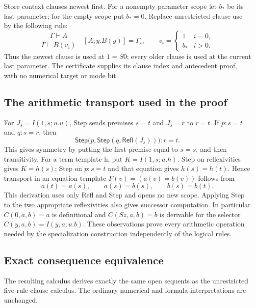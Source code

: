 Store context
clauses newest first.  For a nonempty parameter scope let \(b_*\) be its
last parameter; for the empty scope put \(b_*=0\).  Replace unrestricted
clause use by the following rule:
\[
 \frac{\Gamma\vdash A}{\Gamma\vdash B(v_i)}
 \quad [A;y.B(y)]=\Gamma_i,
 \qquad v_i=\begin{cases}1&i=0,\\ b_*&i>0.\end{cases}
 \tag{Use$_*$}
\]
Thus the newest clause is used at \(1=S0\); every older clause is used
at the current last parameter.  The certificate supplies its clause
index and antecedent proof, with no numerical target or mode bit.

\subsection{The arithmetic transport used in the proof}

For \(J_s=I(1,s;u.u)\), Step sends premises \(s=t\) and \(J_s=r\)
to \(r=t\).  If \(p:s=t\) and \(q:s=r\), then
\[
 \mathsf{Step}\bigl(p,\mathsf{Step}(q,\mathsf{Refl}(J_s))\bigr)
       :r=t.
 \tag{Pivot}
\]
This gives symmetry by putting the first premise equal to \(s=s\), and
then transitivity.  For a term template h, put \(K=I(1,s;u.h)\).
Step on reflexivities gives \(K=h(s)\); Step on \(p:s=t\) and that
equation gives \(h(s)=h(t)\).  Hence transport in an equation template
\(F(v)=(a(v)=b(v))\) follows from
\[
 a(t)=a(s),\qquad a(s)=b(s),\qquad b(s)=b(t).
\]
This derivation uses only Refl and Step and opens no new scope.
Applying Step to the two appropriate reflexivities also gives successor
computation.  In particular \(C(0,a,b)=a\) is definitional and
\(C(Sz,a,b)=b\) is derivable for the selector
\(C(y,a,b)=I(y,a;u.b)\).  These observations prove every arithmetic
operation needed by the specialization construction independently of
the logical rules.

\subsection{Exact consequence equivalence}

\begin{theorem}
The resulting calculus derives exactly the same open sequents as the
unrestricted five-rule clause calculus.  The ordinary numerical and
formula interpretations are unchanged.
\end{theorem}

